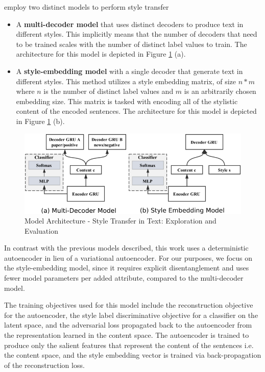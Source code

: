 \cite{fu2017style} employ two distinct models to perform style transfer
\begin{itemize}
	\item A \textbf{multi-decoder model} that uses distinct decoders to produce text in different styles. This implicitly means that the number of decoders that need to be trained scales with the number of distinct label values to train. The architecture for this model is depicted in Figure \ref{fig:semb-architecture} (a).
	\item A \textbf{style-embedding model} with a single decoder that generate text in different styles. This method utilizes a style embedding matrix, of size $n * m$ where $n$ is the number of distinct label values and $m$ is an arbitrarily chosen embedding size. This matrix is tasked with encoding all of the stylistic content of the encoded sentences. The architecture for this model is depicted in Figure \ref{fig:semb-architecture} (b).
\end{itemize}

\begin{figure}[ht]
	\centering
	\includegraphics[width=\textwidth]{images/semb-architecture}
	\caption{\label{fig:semb-architecture} Model Architecture - Style Transfer in Text: Exploration and Evaluation}
\end{figure}

In contrast with the previous models described, this work uses a deterministic autoencoder in lieu of a variational autoencoder. For our purposes, we focus on the style-embedding model, since it requires explicit disentanglement and uses fewer model parameters per added attribute, compared to the multi-decoder model.

The training objectives used for this model include the reconstruction objective for the autoencoder, the style label discriminative objective for a classifier on the latent space, and the adversarial loss propagated back to the autoencoder from the representation learned in the content space. The autoencoder is trained to produce only the salient features that represent the content of the sentences i.e. the content space, and the style embedding vector is trained via back-propagation of the reconstruction loss.

